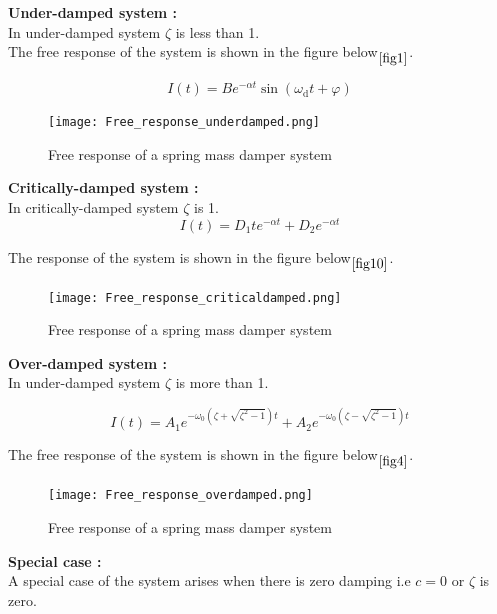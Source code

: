 \documentclass[11pt]{article}
\begin{document}
\noindent\textbf{Under-damped system :} \\
In under-damped system $\zeta$ is less than 1. \\
The free response of the system is shown in the figure below$\phantom{}_{\ref{fig1}}$.

\begin{equation}
I(t) = B e^{-\alpha t} \sin (\omega_\mathrm{d} t + \varphi)
\label{under-damped-eqn}
\end{equation}


\begin{figure}[H]
	\centering
	\centering
	\texttt{[image: Free\_response\_underdamped.png]}
	\caption{Free response of a spring mass damper system}
\end{figure}
\label{fig1}

\noindent\textbf{Critically-damped system :} \\
In critically-damped system $\zeta$ is 1.
\begin{equation}
I(t) = D_1 t e^{-\alpha t} + D_2 e^{-\alpha t}
\label{critically-damped-eqn}
\end{equation}


The response of the system is shown in the figure below$\phantom{}_{\ref{fig10}}$.

\begin{figure}[H]
	\centering
	\centering
	\texttt{[image: Free\_response\_criticaldamped.png]}
	\caption{Free response of a spring mass damper system}
\end{figure}
\label{fig10}

\noindent\textbf{Over-damped system :} \\
In under-damped system $\zeta$ is more than 1.

\begin{equation}
I(t) = A_1 e^{-\omega_0 \left ( \zeta + \sqrt {\zeta^2 - 1} \right ) t} + A_2 e^{-\omega_0 \left ( \zeta - \sqrt {\zeta^2 - 1} \right ) t}
\label{critically-damped-eqn}
\end{equation}


The free response of the system is shown in the figure below$\phantom{}_{\ref{fig4}}$.

\begin{figure}[H]
	\centering
	\centering
	\texttt{[image: Free\_response\_overdamped.png]}
	\caption{Free response of a spring mass damper system}
\end{figure}
\label{fig4}

\noindent\textbf{Special case :} \\
A special case of the system arises when there is zero damping i.e $c = 0$ or $\zeta$ is zero. \\
\end{document}
